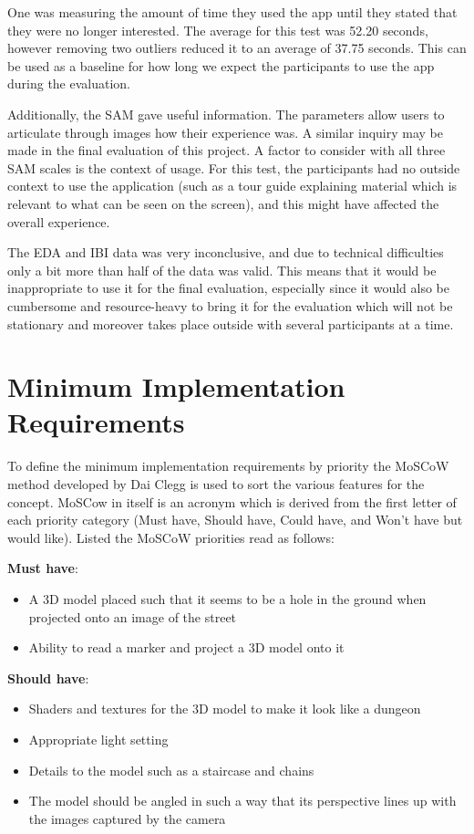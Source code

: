 One was measuring the amount of time they used the app until they stated that they were no longer interested. The average for this test was 52.20 seconds, however removing two outliers reduced it to an average of 37.75 seconds. This can be used as a baseline for how long we expect the participants to use the app during the evaluation.

Additionally, the SAM gave useful information. The parameters allow users to articulate through images how their experience was. A similar inquiry may be made in the final evaluation of this project. A factor to consider with all three SAM scales is the context of usage. For this test, the participants had no outside context to use the application (such as a tour guide explaining material which is relevant to what can be seen on the screen), and this might have affected the overall experience. 

The EDA and IBI data was very inconclusive, and due to technical difficulties only a bit more than half of the data was valid. This means that it would be inappropriate to use it for the final evaluation, especially since it would also be cumbersome and resource-heavy to bring it for the evaluation which will not be stationary and moreover takes place outside with several participants at a time.

\section{Minimum Implementation Requirements}
To define the minimum implementation requirements by priority the MoSCoW method developed by Dai Clegg  is used to sort the various features for the concept. MoSCow in itself is an acronym which is derived from the first letter of each priority category (Must have, Should have, Could have, and Won’t have but would like). Listed the MoSCoW priorities read as follows:

\textbf{Must have}:
\begin{itemize}
\item A 3D model placed such that it seems to be a hole in the ground when projected onto an image of the street
\item Ability to read a marker and project a 3D model onto it
\end{itemize}

\textbf{Should have}:
\begin{itemize}
\item Shaders and textures for the 3D model to make it look like a dungeon
\item Appropriate light setting
\item Details to the model such as a staircase and chains
\item The model should be angled in such a way that its perspective lines up with the images captured by the camera
\end{itemize}

